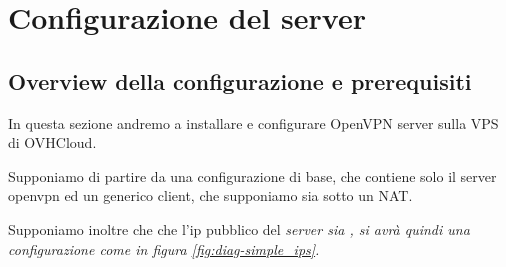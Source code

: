 \chapter{Configurazione del server}
\label{ch:server}


\section{Overview della configurazione e prerequisiti}
\label{sec:overview_server}

In questa sezione andremo a installare e configurare OpenVPN server sulla VPS di OVHCloud.

Supponiamo di partire da una configurazione di base, che contiene solo il server openvpn ed un generico client, che supponiamo sia sotto un NAT.

Supponiamo inoltre che che l'ip pubblico del \it{server} sia , si avrà quindi una configurazione come in figura \ref{fig:diag-simple_ips}.

